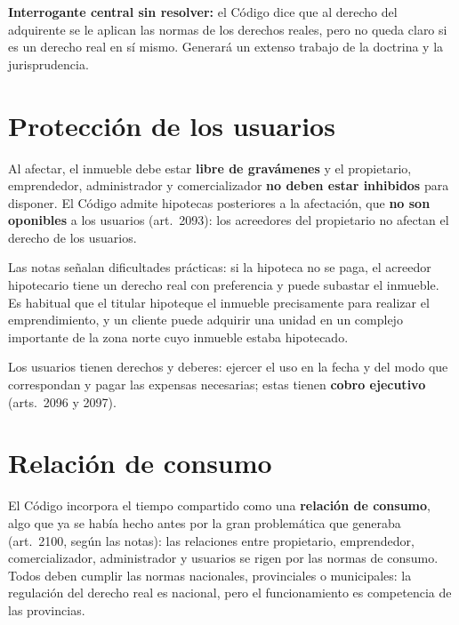\documentclass[12pt,oneside]{book}
\begin{document}
\begin{importante}
\textbf{Interrogante central sin resolver:} el Código dice que al derecho del adquirente se le aplican las normas de los derechos reales, pero no queda claro si es un derecho real en sí mismo. Generará un extenso trabajo de la doctrina y la jurisprudencia.
\end{importante}

\section{Protección de los usuarios}

Al afectar, el inmueble debe estar \textbf{libre de gravámenes} y el propietario, emprendedor, administrador y comercializador \textbf{no deben estar inhibidos} para disponer. El Código admite hipotecas posteriores a la afectación, que \textbf{no son oponibles} a los usuarios (art.~2093): los acreedores del propietario no afectan el derecho de los usuarios.

Las notas señalan dificultades prácticas: si la hipoteca no se paga, el acreedor hipotecario tiene un derecho real con preferencia y puede subastar el inmueble. Es habitual que el titular hipoteque el inmueble precisamente para realizar el emprendimiento, y un cliente puede adquirir una unidad en un complejo importante de la zona norte cuyo inmueble estaba hipotecado.

Los usuarios tienen derechos y deberes: ejercer el uso en la fecha y del modo que correspondan y pagar las expensas necesarias; estas tienen \textbf{cobro ejecutivo} (arts.~2096 y 2097).

\section{Relación de consumo}

El Código incorpora el tiempo compartido como una \textbf{relación de consumo}, algo que ya se había hecho antes por la gran problemática que generaba (art.~2100, según las notas): las relaciones entre propietario, emprendedor, comercializador, administrador y usuarios se rigen por las normas de consumo. %
Todos deben cumplir las normas nacionales, provinciales o municipales: la regulación del derecho real es nacional, pero el funcionamiento es competencia de las provincias.
\end{document}
